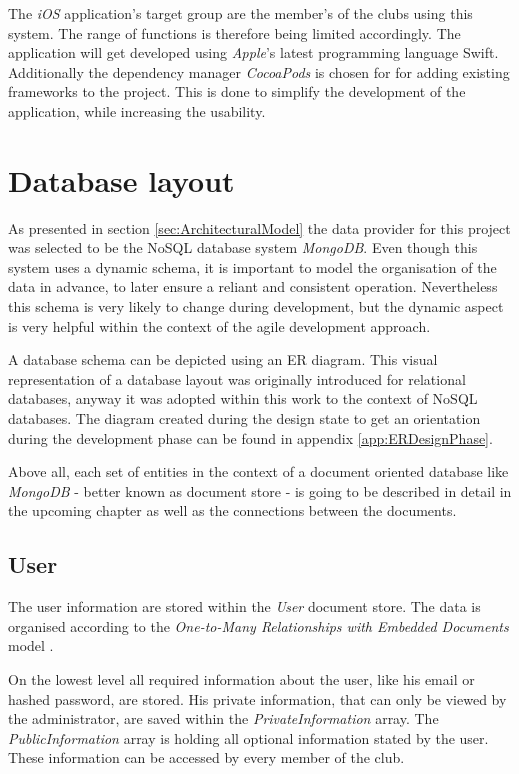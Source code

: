 The \emph{iOS} application's target group are the member's of the clubs using this system. The range of functions is therefore being limited accordingly. The application will get developed using \emph{Apple}'s latest programming language \gls{Swift}. Additionally the dependency manager \emph{CocoaPods} is chosen for for adding existing frameworks to the project. This is done to simplify the development of the application, while increasing the usability.

\section{Database layout}
\label{sec:DatabaseLayout}

As presented in section \vref{sec:ArchitecturalModel} the data provider for this project was selected to be the \gls{NoSQL} database system \emph{MongoDB}. Even though this system uses a dynamic schema, it is important to model the organisation of the data in advance, to later ensure a reliant and consistent operation. Nevertheless this schema is very likely to change during development, but the dynamic aspect is very helpful within the context of the agile development approach.

A database schema can be depicted using an \gls{ER} diagram. This visual representation of a database layout was originally introduced for relational databases, anyway it was adopted within this work to the context of \gls{NoSQL} databases. The diagram created during the design state to get an orientation during the development phase can be found in appendix \vref{app:ERDesignPhase}.

Above all, each set of entities in the context of a document oriented database like \emph{MongoDB} - better known as document store - is going to be described in detail in the upcoming chapter as well as the connections between the documents.

\subsection{User}
The user information are stored within the \emph{User} document store. The data is organised according to the \emph{One-to-Many Relationships with Embedded Documents} model \cite[p. 141]{Mongo:2014aa}.

On the lowest level all required information about the user, like his email or hashed password, are stored. His private information, that can only be viewed by the administrator, are saved within the \emph{PrivateInformation} array. The \emph{PublicInformation} array is holding all optional information stated by the user. These information can be accessed by every member of the club.

